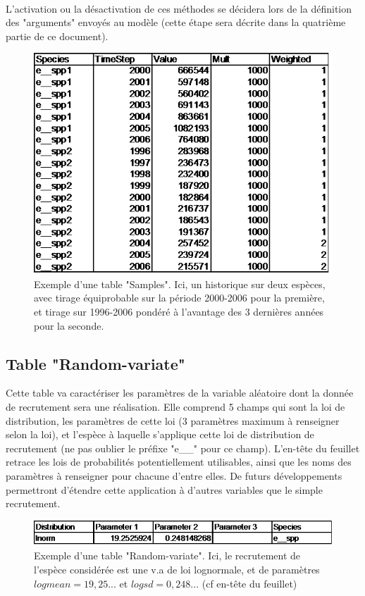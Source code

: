 \documentclass[12pt, colorinlistoftodos]{article}
\newenvironment{not used}[1]{%
    \longtable{%
        |>{\centering$\displaystyle}A{#1}{1}<{$}%
        |}\hline\ignorespaces}{%
    \endlongtable\ignorespacesafterend}
\begin{document}
\par~\par

L'activation ou la désactivation de ces méthodes se décidera lors de la définition des "arguments" envoyés au modèle (cette étape sera décrite dans la quatrième partie de ce document). 
  
\begin{figure}[h!]
    \begin{center}
    \includegraphics[width = 11.19cm]{figures/param/stock14.png}
    \end{center}
    \caption{Exemple d'une table "Samples". Ici, un historique sur deux espèces, avec tirage équiprobable sur la période 2000-2006 pour la première, et tirage sur 1996-2006 pondéré à l'avantage des 3 dernières années pour la seconde.}
    \label{fig:recru}
\end{figure}


\subsection{Table "Random-variate"} \label{sec:rand}

Cette table va caractériser les paramètres de la variable aléatoire dont la donnée de recrutement sera une réalisation. Elle comprend 5 champs qui sont la loi de distribution, les paramètres de cette loi (3 paramètres maximum à renseigner selon la loi), et l'espèce à laquelle s'applique cette loi de distribution de recrutement (ne pas oublier le préfixe "e\_\_" pour ce champ). L'en-tête du feuillet retrace les lois de probabilités potentiellement utilisables, ainsi que les noms des paramètres à renseigner pour chacune d'entre elles. De futurs développements permettront d'étendre cette application à d'autres variables que le simple recrutement.

\begin{figure}[H]
    \begin{center}
    \includegraphics[width = 13.42cm]{figures/param/stock15.png}
    \end{center}
    \caption{Exemple d'une table "Random-variate". Ici, le recrutement de l'espèce considérée est une v.a de loi lognormale, et de paramètres $logmean=19,25...$ et $logsd=0,248...$ (cf en-tête du feuillet)}
    \label{fig:random}
\end{figure}
\end{document}
